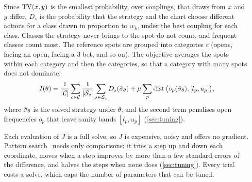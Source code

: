 Since $\operatorname{TV}(x,y)$ is the smallest probability, over couplings, that draws from $x$ and $y$ differ, $D_s$ is the
probability that the strategy and the chart choose different actions for a class drawn in proportion to $w_k$, under
the best coupling for each class. Classes the strategy never brings to the spot do not count, and frequent classes
count most. The reference spots are grouped into categories $c$ (opens, facing an open, facing a 3-bet, and so on).
The objective averages the spots within each category and then the categories, so that a category with many spots
does not dominate:
\[
  J(\theta) = \frac{1}{|\mathcal C|}\sum_{c \in \mathcal C} \frac{1}{|\mathcal S_c|}\sum_{s\in\mathcal S_c}
  D_s(\bar\sigma_\theta) + \mu \sum_{p} \operatorname{dist}\big(o_p(\bar\sigma_\theta), [l_p,u_p]\big),
\]
where $\bar\sigma_\theta$ is the solved strategy under $\theta$, and the second term penalises open frequencies $o_p$
that leave sanity bands $[l_p,u_p]$ (\cref{sec:tuning}).

Each evaluation of $J$ is a full solve, so $J$ is expensive, noisy and offers no gradient. Pattern
search~\cite{hooke1961} needs only comparisons: it tries a step up and down each coordinate, moves when a step
improves by more than a few standard errors of the difference, and halves the steps when none does
(\cref{sec:tuning}). Every trial costs a solve, which caps the number of parameters that can be tuned.

